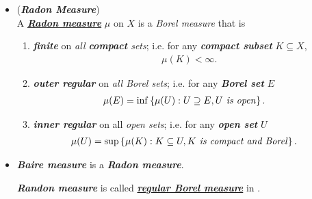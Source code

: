 \documentclass[11pt]{article}
\begin{document}
\begin{itemize}
\item \begin{definition} (\emph{\textbf{Radon Measure}}) \citep{folland2013real} \\
A \underline{\textbf{\emph{Radon measure}}} $\mu$ on $X$ is a \emph{Borel measure} that is 
\begin{enumerate}
\item \emph{\textbf{finite}} on \emph{all \textbf{compact} sets}; i.e. for any \emph{\textbf{compact subset}} $K \subseteq X$, 
\begin{align*}
\mu(K) < \infty.
\end{align*}
\item \emph{\textbf{outer regular}} on \emph{all Borel sets}; i.e. for any \emph{\textbf{Borel set}} $E$ 
\begin{align*}
\mu(E) &= \inf\left\{\mu(U): U \supseteq E , U \text{\emph{ is open}}\right\}.
\end{align*}
\item  \emph{\textbf{inner regular}} on all \emph{open sets}; i.e. for any \emph{\textbf{open set}} $U$
\begin{align*}
\mu(U) &= \sup\left\{\mu(K): K \subseteq U, K \text{\emph{ is compact and Borel}}\right\}.
\end{align*}
\end{enumerate}
\end{definition}

\item \begin{remark}
\emph{\textbf{Baire measure}} is a \emph{\textbf{Radon measure}}. 

\emph{\textbf{Randon measure}} is called \underline{\emph{\textbf{regular Borel measure}}} in \citep{reed1980methods}.
\end{remark}
\end{itemize}
\end{document}
